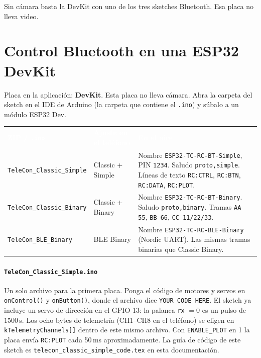 \documentclass[12pt,a4paper]{article}
\newcommand{\thc}[1]{\textcolor{white}{\bfseries #1}}
\newcommand{\ui}[1]{\textsf{\textbf{#1}}}
\begin{document}
Sin cámara basta la DevKit con uno de los tres sketches Bluetooth. Esa
placa no lleva video.

\section{Control Bluetooth en una ESP32 DevKit}

Placa en la aplicación: \ui{DevKit}. Esta placa no lleva cámara. Abra la
carpeta del sketch en el IDE de Arduino (la carpeta que contiene el
\texttt{.ino}) y súbalo a un módulo ESP32 Dev.

\begin{center}
\renewcommand{\arraystretch}{1.28}
\setlength{\tabcolsep}{4pt}
\begin{tabular}{>{\raggedright\arraybackslash}p{4.3cm}
                >{\raggedright\arraybackslash}p{4.6cm}
                >{\raggedright\arraybackslash}p{5.3cm}}
\rowcolor{TblHead}
\thc{ZIP / \texttt{.ino}} & \thc{Ajuste en el teléfono} & \thc{En el aire} \\
\rowcolor{TblChan}
\texttt{TeleCon\_Classic\_Simple} & Classic + Simple & Nombre \texttt{ESP32-TC-RC-BT-Simple}, PIN \texttt{1234}. Saludo \texttt{proto,simple}. Líneas de texto \texttt{RC:CTRL}, \texttt{RC:BTN}, \texttt{RC:DATA}, \texttt{RC:PLOT}. \\
\rowcolor{TblChan}
\texttt{TeleCon\_Classic\_Binary} & Classic + Binary & Nombre \texttt{ESP32-TC-RC-BT-Binary}. Saludo \texttt{proto,binary}. Tramas \texttt{AA 55}, \texttt{BB 66}, \texttt{CC 11/22/33}. \\
\rowcolor{TblChan}
\texttt{TeleCon\_BLE\_Binary} & BLE Binary & Nombre \texttt{ESP32-TC-RC-BLE-Binary} (Nordic UART). Las mismas tramas binarias que Classic Binary. \\
\end{tabular}
\end{center}

\paragraph{\texttt{TeleCon\_Classic\_Simple.ino}}
Un solo archivo para la primera placa. Ponga el código de motores y servos
en \texttt{onControl()} y \texttt{onButton()}, donde el archivo dice
\texttt{YOUR CODE HERE}. El sketch ya incluye un servo de dirección en el
GPIO 13: la palanca \texttt{rx} $= 0$ es un pulso de $1500$\,\textmu s.
Los ocho bytes de telemetría (CH1--CH8 en el teléfono) se eligen en
\texttt{kTelemetryChannels[]} dentro de este mismo archivo. Con
\texttt{ENABLE\_PLOT} en 1 la placa envía \texttt{RC:PLOT} cada 50\,ms
aproximadamente.
La guía de código de este sketch es
\texttt{telecon\_classic\_simple\_code.tex} en esta documentación.
\end{document}
